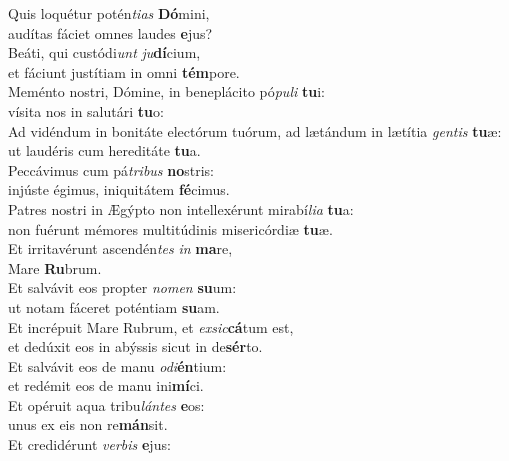 \evenverse Quis loquétur potén\textit{ti}\textit{as} \textbf{Dó}mini,~\*\\
\evenverse audítas fáciet omnes laudes \textbf{e}jus?\\
\oddverse Beáti, qui custódi\textit{unt} \textit{ju}\textbf{dí}cium,~\*\\
\oddverse et fáciunt justítiam in omni \textbf{tém}pore.\\
\evenverse Meménto nostri, Dómine, in beneplácito pó\textit{pu}\textit{li} \textbf{tu}i:~\*\\
\evenverse vísita nos in salutári \textbf{tu}o:\\
\oddverse Ad vidéndum in bonitáte electórum tuórum, ad lætándum in lætítia \textit{gen}\textit{tis} \textbf{tu}æ:~\*\\
\oddverse ut laudéris cum hereditáte \textbf{tu}a.\\
\evenverse Peccávimus cum pá\textit{tri}\textit{bus} \textbf{no}stris:~\*\\
\evenverse injúste égimus, iniquitátem \textbf{fé}cimus.\\
\oddverse Patres nostri in Ægýpto non intellexérunt mirabí\textit{li}\textit{a} \textbf{tu}a:~\*\\
\oddverse non fuérunt mémores multitúdinis misericórdiæ \textbf{tu}æ.\\
\evenverse Et irritavérunt ascendén\textit{tes} \textit{in} \textbf{ma}re,~\*\\
\evenverse Mare \textbf{Ru}brum.\\
\oddverse Et salvávit eos propter \textit{no}\textit{men} \textbf{su}um:~\*\\
\oddverse ut notam fáceret poténtiam \textbf{su}am.\\
\evenverse Et incrépuit Mare Rubrum, et \textit{ex}\textit{sic}\textbf{cá}tum est,~\*\\
\evenverse et dedúxit eos in abýssis sicut in de\textbf{sér}to.\\
\oddverse Et salvávit eos de manu \textit{o}\textit{di}\textbf{én}tium:~\*\\
\oddverse et redémit eos de manu ini\textbf{mí}ci.\\
\evenverse Et opéruit aqua tribu\textit{lán}\textit{tes} \textbf{e}os:~\*\\
\evenverse unus ex eis non re\textbf{mán}sit.\\
\oddverse Et credidérunt \textit{ver}\textit{bis} \textbf{e}jus:~\*\\
